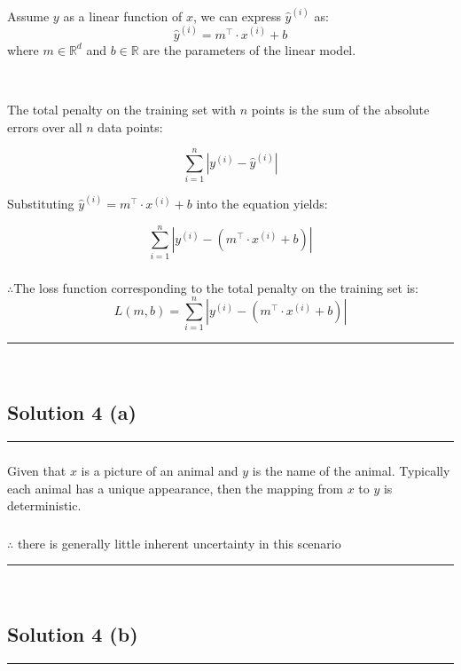 \documentclass{article}
\begin{document}
\parbox{\textwidth}{
Assume $y$ as a linear function of $x$, we can express $\hat{y}^{(i)}$ as:
\[
\hat{y}^{(i)} = m^\top \cdot x^{(i)} + b
\]
where $m \in \mathbb{R}^d$ and $b \in \mathbb{R}$ are the parameters of the linear model.
}\\

\parbox{\textwidth}{
The total penalty on the training set with $n$ points is the sum of the absolute errors over all $n$ data points:
}
$$\sum_{i=1}^n \left| y^{(i)} - \hat{y}^{(i)} \right|$$

\parbox{\textwidth}{
Substituting $\hat{y}^{(i)}=m^\top \cdot x^{(i)} + b$ into the equation yields:
}

$$  \sum_{i=1}^n \left| y^{(i)} - (m^\top \cdot x^{(i)} + b) \right|$$


\subsubsection*{\normalfont}{$\therefore$The loss function corresponding to the total penalty on the training set is:}
$$L(m, b) = \sum_{i=1}^n \left| y^{(i)} - (m^\top \cdot x^{(i)} + b) \right|$$

\noindent\rule{\textwidth}{0.4pt}\\

\newpage

\subsection*{Solution 4 (a)}
\noindent\rule{\textwidth}{0.4pt}

\subsubsection*{}
\parbox{\textwidth}{
Given that $x$ is a picture of an animal and $y$ is the name of the animal. Typically each animal has a unique appearance, then the mapping from $x$ to $y$ is deterministic. 
}

\subsubsection*{\normalfont}{$\therefore$ there is generally little inherent uncertainty in this scenario}


\noindent\rule{\textwidth}{0.4pt}\\

\newpage

\subsection*{Solution 4 (b)}
\noindent\rule{\textwidth}{0.4pt}
\end{document}
